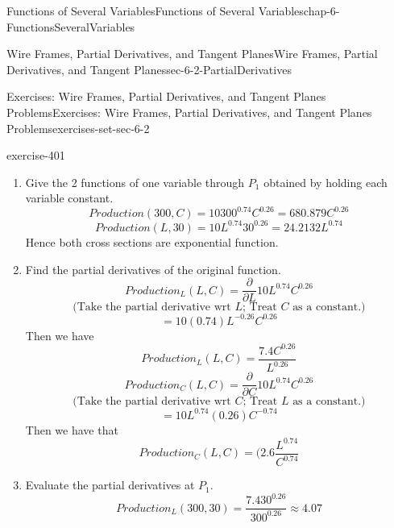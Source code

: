 \documentclass[oneside,10pt,]{book}
\numberwithin{equation}{section}
\begin{document}
\begin{chapterptx}{Functions of Several Variables}{}{Functions of Several Variables}{}{}{chap-6-FunctionsSeveralVariables}
\begin{sectionptx}{Wire Frames, Partial Derivatives, and Tangent Planes}{}{Wire Frames, Partial Derivatives, and Tangent Planes}{}{}{sec-6-2-PartialDerivatives}
\begin{exercises-subsection-numberless}{Exercises: Wire Frames, Partial Derivatives, and Tangent Planes Problems}{}{Exercises: Wire Frames, Partial Derivatives, and Tangent Planes Problems}{}{}{exercises-set-sec-6-2}
\begin{exercisegroup}
\begin{divisionexerciseeg}{7}{}{}{exercise-401}
\leavevmode%
\begin{enumerate}[label=(\alph*)]
\item\hypertarget{li-632}{}\hypertarget{p-2289}{}%
Give the 2 functions of one variable through \(P_1\) obtained by holding each variable constant.%
%
\begin{equation*}
Production(300,C)=10 300^{0.74}  C^{0.26}=680.879 C^{0.26}  
\end{equation*}
%
\begin{equation*}
Production(L,30)=10 L^{0.74}  30^{0.26}=24.2132 L^{0.74} 
\end{equation*}
\hypertarget{p-2290}{}%
Hence both cross sections are exponential function.%
\item\hypertarget{li-633}{}\hypertarget{p-2291}{}%
Find the partial derivatives of the original function.%
%
\begin{equation*}
Production_L  (L,C)=\frac{\partial}{\partial L} 10 L^{0.74}  C^{0.26}
\end{equation*}
%
\begin{equation*}
\text{(Take the partial derivative wrt }L\text{; Treat }C\text{ as a constant.)}
\end{equation*}
%
\begin{equation*}
=10 (0.74) L^{-0.26}  C^{0.26}
\end{equation*}
\hypertarget{p-2292}{}%
Then we  have%
%
\begin{equation*}
Production_L  (L,C)=\frac{7.4 C^{0.26}}{L^{0.26}}
\end{equation*}
%
\begin{equation*}
Production_C  (L,C)=\frac{\partial}{\partial C} 10 L^{0.74}  C^{0.26}
\end{equation*}
%
\begin{equation*}
\text{(Take the partial derivative wrt }C\text{; Treat }L\text{ as a constant.)}
\end{equation*}
%
\begin{equation*}
=10 L^{0.74} (0.26) C^{-0.74}
\end{equation*}
\hypertarget{p-2293}{}%
Then we  have that%
%
\begin{equation*}
Production_C  (L,C)=(2.6 \frac{L^{0.74}}{C^{0.74}}
\end{equation*}
\item\hypertarget{li-634}{}\hypertarget{p-2294}{}%
Evaluate the partial derivatives at \(P_1\).%
%
\begin{equation*}
Production_L  (300, 30)=\frac{7.4 30^{0.26}}{300^{0.26}}
\approx 4.07
\end{equation*}

\end{enumerate}
\end{divisionexerciseeg}
\end{exercisegroup}
\end{exercises-subsection-numberless}
\end{sectionptx}
\end{chapterptx}
\end{document}
